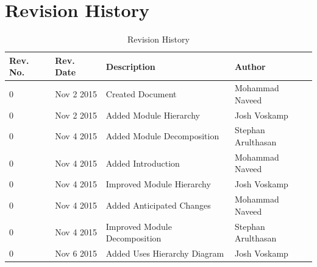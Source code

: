 \documentclass[12pt]{article}
\begin{document}
\newpage
\tableofcontents
\newpage
\listoftables
{}
\newpage
\listoffigures
{}
\newpage

\section*{Revision History}
\begin{table}[!htbp]
	\centering
	\begin{tabular}{ | p{2cm} | p{2cm}| p{6cm} | p{4cm}|}
		\hline
		Rev. No. & Rev. Date & Description & Author \\\hline
		0 & Nov 2 2015 & Created Document & Mohammad Naveed \\\hline
		0 & Nov 2 2015 & Added Module Hierarchy & Josh Voskamp \\\hline
		0 & Nov 4 2015 & Added Module Decomposition & Stephan Arulthasan\\\hline
		0 & Nov 4 2015 & Added Introduction & Mohammad Naveed \\\hline
		0 & Nov 4 2015 & Improved Module Hierarchy & Josh Voskamp \\\hline
		0 & Nov 4 2015 & Added Anticipated Changes & Mohammad Naveed \\\hline
		0 & Nov 4 2015 & Improved Module Decomposition & Stephan Arulthasan \\\hline
		0 & Nov 6 2015 & Added Uses Hierarchy Diagram & Josh Voskamp \\\hline
		
	\end{tabular}
	\caption{Revision History}
\end{table}
\newpage
\end{document}
